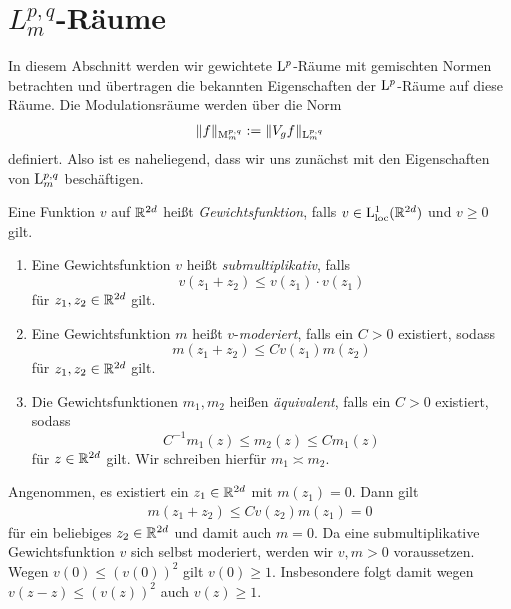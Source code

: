 \section{$ L^{p,q}_m $-Räume}

In diesem Abschnitt werden wir gewichtete $ \mathrm{L}^p $-Räume mit gemischten Normen betrachten und  übertragen die bekannten Eigenschaften der $ \mathrm{L}^p $-Räume auf diese Räume. 
Die Modulationsräume werden über die Norm 
\begin{align*}
\| f \|_{\mathrm{M}_m^{p,q}} := \| V_g f \|_{\mathrm{L}_m^{p,q}}
\end{align*}
definiert. 
Also ist es naheliegend, dass wir uns zunächst mit den Eigenschaften von $ \mathrm{L}_m^{p,q} $ beschäftigen.



\begin{df}\label{weight_function}
	Eine Funktion $ v $ auf $ \mathbb{R}^{2d} $ heißt \textit{Gewichtsfunktion}, falls $ v \in \mathrm{L}^1_\mathrm{loc}(\mathbb{R}^{2d}) $ und $ v \geq 0 $ gilt.
	\begin{enumerate}[label =\textbf{(\roman*)}]
		\item 
		Eine Gewichtsfunktion $ v $ heißt \textit{submultiplikativ}, falls
		\begin{equation}\label{submultiplicative_weight}
		v(z_1 + z_2) \leq v(z_1) \cdot v(z_1)
		\end{equation}
		für $ z_1, z_2 \in \mathbb{R}^{2d} $ gilt.
	
		\item
		Eine Gewichtsfunktion $ m $ heißt $ v $-\textit{moderiert}, falls ein $ C > 0 $ existiert, sodass
		\begin{equation}\label{eq:v_moderate}
		m(z_1 + z_2)\leq C v(z_1) m(z_2)
		\end{equation}
		für $ z_1, z_2 \in \mathbb{R}^{2d} $ gilt.
		
		\item
		Die Gewichtsfunktionen $ m_1, m_2 $ heißen \textit{äquivalent}, falls
		ein $ C > 0 $ existiert, sodass
		\begin{equation}\label{equivalence_weights}
		C^{-1} m_1(z) \leq m_2(z) \leq C m_1(z)
		\end{equation}
		für $ z \in \mathbb{R}^{2d} $ gilt. 
		Wir schreiben hierfür $ m_1 \asymp m_2 $.
	\end{enumerate}
\end{df}


Angenommen, es existiert ein $ z_1  \in \mathbb{R}^{2d}$ mit $ m(z_1) = 0 $.
Dann gilt
\begin{align*}
m(z_1 + z_2) \leq C v(z_2) m(z_1) = 0
\end{align*}
für ein beliebiges $ z_2 \in \mathbb{R}^{2d} $ und damit auch $ m= 0 $.
Da eine submultiplikative Gewichtsfunktion $ v $ sich selbst moderiert, werden wir $ v,m > 0 $ voraussetzen.
Wegen $ v(0) \leq (v(0))^2 $ gilt $ v(0) \geq 1 $. 
Insbesondere folgt damit wegen $ v(z - z) \leq (v(z))^2 $
auch $ v(z) \geq 1 $.  

